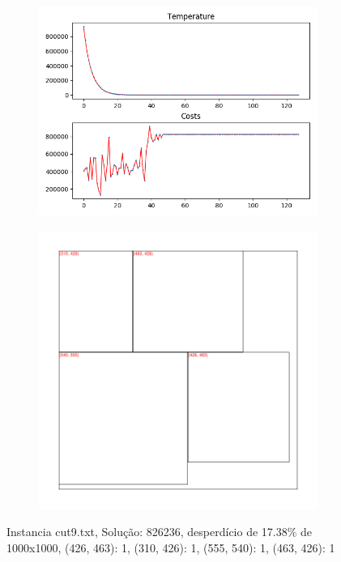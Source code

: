\begin{figure}
\centering
\begin{subfigure}{.5\textwidth}
  \centering
  \includegraphics[width=1\linewidth]{results/cut9/2/plot}
  \label{fig:sub1}
\end{subfigure}%
\begin{subfigure}{.5\textwidth}
  \centering
  \includegraphics[width=1\linewidth]{results/cut9/2/cut}
  \label{fig:sub2}
\end{subfigure}
\caption{Instancia cut9.txt, Solução: 826236, desperdício de 17.38\% de 1000x1000, {(426, 463): 1, (310, 426): 1, (555, 540): 1, (463, 426): 1}}
\label{fig:test}
\end{figure}


